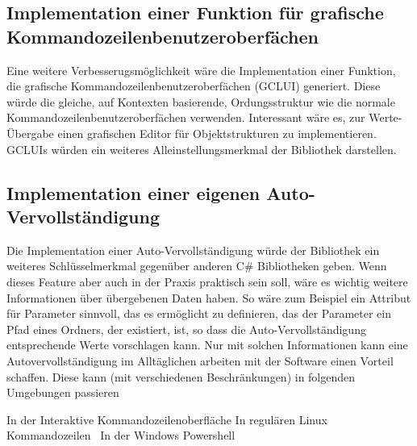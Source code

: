 \subsection{Implementation einer Funktion für grafische Kommandozeilenbenutzeroberfächen}
Eine weitere Verbesserugsmöglichkeit wäre die Implementation einer Funktion, die grafische Kommandozeilenbenutzeroberfächen (GCLUI) generiert.
Diese würde die gleiche, auf Kontexten basierende, Ordungsstruktur wie die normale Kommandozeilenbenutzeroberfächen verwenden.
Interessant wäre es, zur Werte-\"Ubergabe einen grafischen Editor für Objektstrukturen zu implementieren.
GCLUIs würden ein weiteres Alleinstellungsmerkmal der Bibliothek darstellen.
\subsection{Implementation einer eigenen Auto-Vervollständigung}\label{subsec:Autocomplete}
Die Implementation einer Auto-Vervollständigung würde der Bibliothek ein weiteres Schlüsselmerkmal gegenüber anderen C\# Bibliotheken geben.
Wenn dieses Feature aber auch in der Praxis praktisch sein soll, wäre es wichtig weitere Informationen über übergebenen Daten haben.
So wäre zum Beispiel ein Attribut für Parameter sinnvoll, das es ermöglicht zu definieren, das der Parameter ein Pfad eines Ordners,
der existiert, ist, so dass die Auto-Vervollständigung entsprechende Werte vorschlagen kann.
Nur mit solchen Informationen kann eine Autovervollständigung im Alltäglichen arbeiten mit der Software einen Vorteil schaffen.
Diese kann (mit verschiedenen Beschränkungen) in folgenden Umgebungen passieren
\begin{outline}
 \1 In der Interaktive Kommandozeilenoberfläche
 \1 In regulären Linux Kommandozeilen~\cite{BashAutoComplete}
 \1 In der Windows Powershell
\end{outline}
